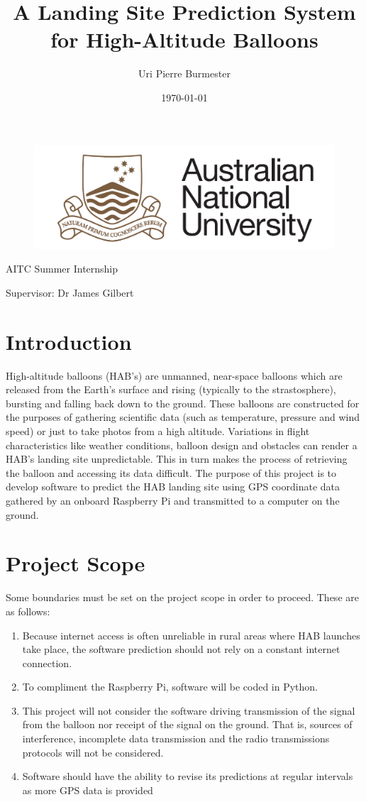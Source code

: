 \documentclass[11pt]{article}
\title{A Landing Site Prediction System for High-Altitude Balloons \large}
\author{Uri Pierre Burmester}
\date{\today}
\begin{document}
\begin{figure} \centering
  \includegraphics[width=0.5\linewidth]{ANU.png}
\end{figure}

\maketitle

\centerline{AITC Summer Internship}  
\centerline{Supervisor: Dr James Gilbert} 

\newpage

\tableofcontents

\newpage

\section{Introduction}
High-altitude balloons (HAB's) are unmanned, near-space balloons which are released from the Earth's surface and rising (typically to the strastosphere), bursting and falling back down to the ground. These balloons are constructed for the purposes of gathering scientific data (such as temperature, pressure and wind speed) or just to take photos from a high altitude. Variations in flight characteristics like weather conditions, balloon design and obstacles can render a HAB's landing site unpredictable. This in turn makes the process of retrieving the balloon and accessing its data difficult. The purpose of this project is to develop software to predict the HAB landing site using GPS coordinate data gathered by an onboard Raspberry Pi and transmitted to a computer on the ground. 

\section{Project Scope}

Some boundaries must be set on the project scope in order to proceed. These are as follows:

\begin{enumerate}
\item Because internet access is often unreliable in rural areas where HAB launches take place, the software prediction should not rely on a constant internet connection.
\item To compliment the Raspberry Pi, software will be coded in Python. 
\item This project will not consider the software driving transmission of the signal from the balloon nor receipt of the signal on the ground. That is, sources of interference, incomplete data transmission and the radio transmissions protocols will not be considered.  
\item Software should have the ability to revise its predictions at regular intervals as more GPS data is provided 
\end{enumerate}
\end{document}
